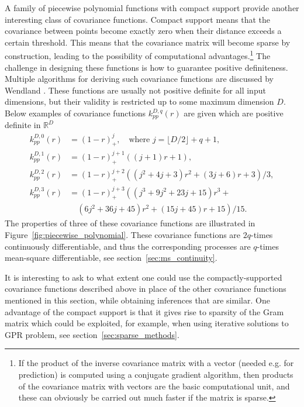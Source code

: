 \documentclass[11pt]{book}
\begin{document}
A family of piecewise polynomial functions with compact support provide another interesting class of covariance functions. Compact support means that the covariance between points become exactly zero when their distance exceeds a certain threshold. This means that the covariance matrix will become sparse by construction, leading to the possibility of computational advantages.\footnote{If the product of the inverse covariance matrix with a vector (needed e.g. for prediction) is computed using a conjugate gradient algorithm, then products of the covariance matrix with vectors are the basic computational unit, and these can obviously be carried out much faster if the matrix is sparse.} The challenge in designing these functions is how to guarantee positive definiteness. Multiple algorithms for deriving such covariance functions are discussed by Wendland \cite{wendland2005}. These functions are usually not positive definite for all input dimensions, but their validity is restricted up to some maximum dimension $D$. Below examples of covariance functions $k_{pp}^{D,q}(r)$ are given which are positive definite in $\mathbb{R}^D$
\begin{align}
\label{eq:piecewise_polynomial}
k_{pp}^{D,0}(r) &= (1-r)_+^j, \quad \text{where } j = \lfloor D/2 \rfloor + q + 1, \\
k_{pp}^{D,1}(r) &= (1-r)_+^{j+1} \left((j+1)r + 1\right), \nonumber \\
k_{pp}^{D,2}(r) &= (1-r)_+^{j+2} \left((j^2 + 4j + 3)r^2 + (3j + 6)r + 3\right)/3, \nonumber \\
k_{pp}^{D,3}(r) &= (1-r)_+^{j+3} \left((j^3 + 9j^2 + 23j + 15)r^3 + \right. \nonumber \\
&\quad \left. (6j^2 + 36j + 45)r^2 + (15j + 45)r + 15\right)/15. \nonumber
\end{align}
The properties of three of these covariance functions are illustrated in Figure~\ref{fig:piecewise_polynomial}. These covariance functions are $2q$-times continuously differentiable, and thus the corresponding processes are $q$-times mean-square differentiable, see section~\ref{sec:ms_continuity}.

It is interesting to ask to what extent one could use the compactly-supported covariance functions described above in place of the other covariance functions mentioned in this section, while obtaining inferences that are similar. One advantage of the compact support is that it gives rise to sparsity of the Gram matrix which could be exploited, for example, when using iterative solutions to GPR problem, see section~\ref{sec:sparse_methods}.
\end{document}
